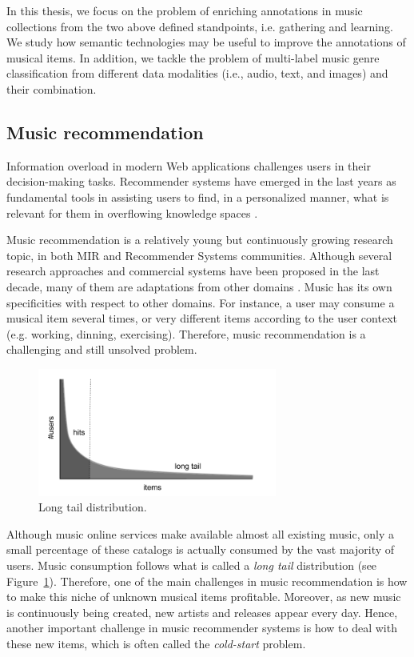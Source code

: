 In this thesis, we focus on the problem of enriching annotations in music collections from the two above defined standpoints, i.e. gathering and learning. We study how semantic technologies may be useful to improve the annotations of musical items. In addition, we tackle the problem of multi-label music genre classification from different data modalities (i.e., audio, text, and images) and their combination.


\subsection{Music recommendation}
\label{sec:intro:recommendation}

Information overload in modern Web applications challenges users in their decision-making tasks. Recommender systems have emerged in the last years as fundamental tools in assisting users to find, in a personalized manner, what is relevant for them in overflowing knowledge spaces \cite{ricci2011introduction}. 

Music recommendation is a relatively young but continuously growing research topic, in both MIR and Recommender Systems communities. Although several research approaches and commercial systems have been proposed in the last decade, many of them are adaptations from other domains \citep{oscarBook}. 
Music has its own specificities with respect to other domains. For instance, a user may consume a musical item several times, or very different items according to the user context (e.g. working, dinning, exercising). Therefore, music recommendation is a challenging and still unsolved problem.

\begin{figure}
	\centering
	\includegraphics[width=0.7\textwidth]{ch01_introduction_pics/Long_tail_bn.png}
	\caption{Long tail distribution.\label{fig:soa:longtail}}
\end{figure}

Although music online services make available almost all existing music, only a small percentage of these catalogs is actually consumed by the vast majority of users. Music consumption follows what is called a \textit{long tail} distribution \citep{oscarBook} (see Figure~\ref{fig:soa:longtail}). Therefore, one of the main challenges in music recommendation is how to make this niche of unknown musical items profitable. Moreover, as new music is continuously being created, new artists and releases appear every day. Hence, another important challenge in music recommender systems is how to deal with these new items, which is often called the \textit{cold-start} problem. %

